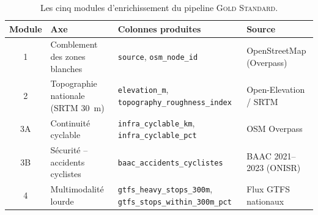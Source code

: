 \documentclass[11pt,a4paper]{article}
\newcommand{\GS}{\textsc{Gold Standard}\xspace}
\begin{document}
\begin{table}[H]
\centering
\caption{Les cinq modules d'enrichissement du pipeline \GS.}
\label{tab:pipeline}
\small
\begin{tabular}{@{}clp{4.7cm}l@{}}
\toprule
\textbf{Module} & \textbf{Axe} & \textbf{Colonnes produites} &
\textbf{Source} \\
\midrule
1  & Comblement des zones blanches & \texttt{source},
\texttt{osm\_node\_id} & OpenStreetMap (Overpass) \\
2  & Topographie nationale (SRTM \SI{30}{\metre}) &
\texttt{elevation\_m},
\texttt{topography\_roughness\_index} &
Open-Elevation / SRTM \\
3A & Continuité cyclable &
\texttt{infra\_cyclable\_km},
\texttt{infra\_cyclable\_pct} & OSM Overpass \\
3B & Sécurité -- accidents cyclistes &
\texttt{baac\_accidents\_cyclistes} & BAAC 2021--2023 (ONISR) \\
4  & Multimodalité lourde &
\texttt{gtfs\_heavy\_stops\_300m},
\texttt{gtfs\_stops\_within\_300m\_pct} & Flux GTFS nationaux \\
\bottomrule
\end{tabular}
\end{table}
\end{document}
